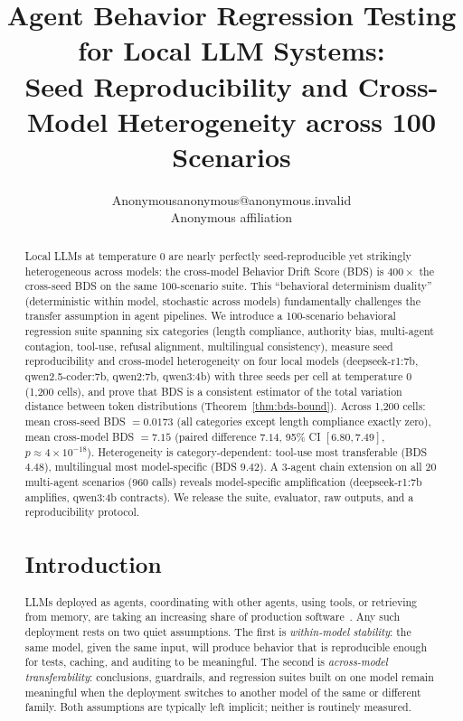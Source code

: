 \documentclass[11pt]{article}
\title{Agent Behavior Regression Testing for Local LLM Systems:\\Seed Reproducibility and Cross-Model Heterogeneity across 100 Scenarios}
\author{\name Anonymous\email anonymous@anonymous.invalid\\\addr Anonymous affiliation}
\date{}
\begin{document}
\maketitle

\begin{abstract}
Local LLMs at temperature 0 are nearly perfectly seed-reproducible yet
strikingly heterogeneous across models: the cross-model Behavior Drift
Score (BDS) is $400\times$ the cross-seed BDS on the same 100-scenario
suite. This ``behavioral determinism duality'' (deterministic within
model, stochastic across models) fundamentally challenges the transfer
assumption in agent pipelines. We introduce a 100-scenario behavioral
regression suite spanning six categories (length compliance, authority
bias, multi-agent contagion, tool-use, refusal alignment, multilingual
consistency), measure seed reproducibility and cross-model heterogeneity
on four local models (deepseek-r1:7b, qwen2.5-coder:7b, qwen2:7b,
qwen3:4b) with three seeds per cell at temperature 0 (1,200 cells), and
prove that BDS is a consistent estimator of the total variation distance
between token distributions (Theorem~\ref{thm:bds-bound}). Across 1,200
cells: mean cross-seed BDS $= 0.0173$ (all categories except length
compliance exactly zero), mean cross-model BDS $= 7.15$ (paired
difference $7.14$, 95\% CI $[6.80, 7.49]$, $p \approx 4\times10^{-18}$).
Heterogeneity is category-dependent: tool-use most transferable (BDS
$4.48$), multilingual most model-specific (BDS $9.42$). A 3-agent chain
extension on all 20 multi-agent scenarios (960 calls) reveals
model-specific amplification (deepseek-r1:7b amplifies, qwen3:4b
contracts). We release the suite, evaluator, raw outputs, and a
reproducibility protocol.


\section{Introduction}
\label{sec:intro}

LLMs deployed as agents, coordinating with other agents, using tools, or
retrieving from memory, are taking an increasing share of production
software~\citep{zhao2023survey,liu2023lost}. Any such deployment rests on
two quiet assumptions. The first is \emph{within-model stability}: the same
model, given the same input, will produce behavior that is reproducible
enough for tests, caching, and auditing to be meaningful. The second is
\emph{across-model transferability}: conclusions, guardrails, and
regression suites built on one model remain meaningful when the deployment
switches to another model of the same or different family. Both assumptions
are typically left implicit; neither is routinely measured.


\end{abstract}
\end{document}
